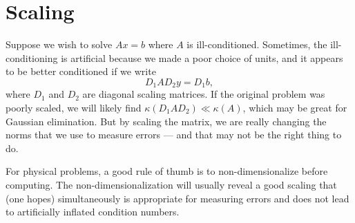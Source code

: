 \section{Scaling}

Suppose we wish to solve $Ax = b$ where $A$ is ill-conditioned.  Sometimes,
the ill-conditioning is artificial because we made a poor choice of units,
and it appears to be better conditioned if we write
\[
  D_1 A D_2 y = D_1 b,
\]
where $D_1$ and $D_2$ are diagonal scaling matrices.  If the original problem
was poorly scaled, we will likely find $\kappa(D_1 A D_2) \ll \kappa(A)$,
which may be great for Gaussian elimination.  But by scaling the matrix, we
are really changing the norms that we use to measure errors --- and that may
not be the right thing to do.

For physical problems, a good rule of thumb is to non-dimensionalize
before computing.  The non-dimensionalization will usually reveal a good
scaling that (one hopes) simultaneously is appropriate for measuring errors
and does not lead to artificially inflated condition numbers.

